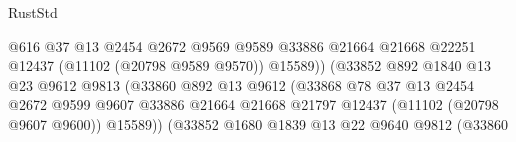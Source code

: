\begin{lexlean}{RustStd}
\begin{coremodule}
                                                @616
                                                @37
                                                @13
                                                @2454
                                                @2672
                                                @9569
                                                @9589
                                                @33886
                                                @21664
                                                @21668
                                                @22251
                                                @12437
                                                (@11102 (@20798 @9589 @9570))
                                                @15589))
                                            (@33852
                                              @892
                                              @1840
                                              @13
                                              @23
                                              @9612
                                              @9813
                                              (@33860
                                                @892
                                                @13
                                                @9612
                                                (@33868
                                                  @78
                                                  @37
                                                  @13
                                                  @2454
                                                  @2672
                                                  @9599
                                                  @9607
                                                  @33886
                                                  @21664
                                                  @21668
                                                  @21797
                                                  @12437
                                                  (@11102 (@20798 @9607 @9600))
                                                  @15589))
                                              (@33852
                                                @1680
                                                @1839
                                                @13
                                                @22
                                                @9640
                                                @9812
                                                (@33860

\end{coremodule}
\end{lexlean}
